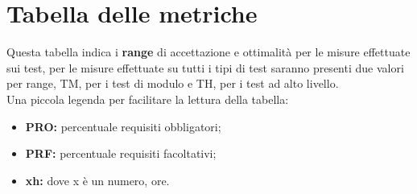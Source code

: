 \documentclass[PianoDiProgetto.tex]{subfiles}
\begin{document}
\section{Tabella delle metriche}
Questa tabella indica i \textbf{range} di accettazione e ottimalità per le misure effettuate sui test, per le misure effettuate su tutti i tipi di test saranno presenti due valori per range, TM, per i test di modulo e TH, per i test ad alto livello.\\
Una piccola legenda per facilitare la lettura della tabella: \\
\begin{itemize}
\item \textbf{PRO:} percentuale requisiti obbligatori;
\item \textbf{PRF:} percentuale requisiti facoltativi;
\item \textbf{xh:} dove x è un numero, ore.
\end{itemize}
\end{document}
